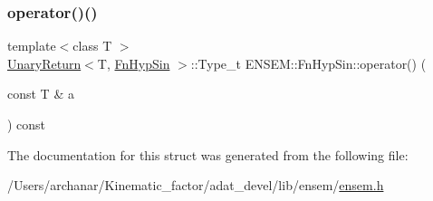 \mbox{\label{structENSEM_1_1FnHypSin_a21db44c9d0efe64e1e59ceae24fc7d48}} 
\subsubsection{\texorpdfstring{operator()()}{operator()()}\hspace{0.1cm}{\footnotesize\ttfamily [2/2]}}
{\footnotesize\ttfamily template$<$class T $>$ \\
\mbox{\hyperlink{structENSEM_1_1UnaryReturn}{Unary\+Return}}$<$T, \mbox{\hyperlink{structENSEM_1_1FnHypSin}{Fn\+Hyp\+Sin}} $>$\+::Type\+\_\+t E\+N\+S\+E\+M\+::\+Fn\+Hyp\+Sin\+::operator() (\begin{DoxyParamCaption}\item[{const T \&}]{a }\end{DoxyParamCaption}) const\hspace{0.3cm}{\ttfamily [inline]}}



The documentation for this struct was generated from the following file\+:\begin{DoxyCompactItemize}
\item 
/\+Users/archanar/\+Kinematic\+\_\+factor/adat\+\_\+devel/lib/ensem/\mbox{\hyperlink{lib_2ensem_2ensem_8h}{ensem.\+h}}\end{DoxyCompactItemize}

